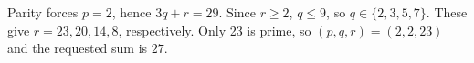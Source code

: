 Parity forces $p=2$, hence $3q+r=29$. Since $r\ge2$, $q\le9$, so $q\in\{2,3,5,7\}$. These give $r=23,20,14,8$, respectively. Only 23 is prime, so $(p,q,r)=(2,2,23)$ and the requested sum is $\boxed{27}$.
